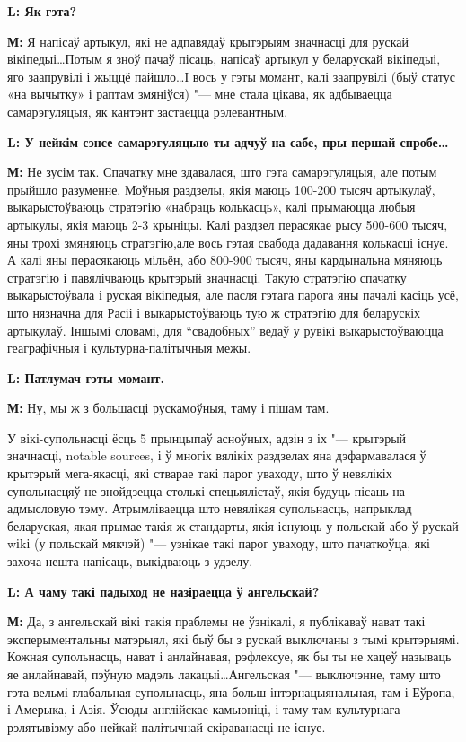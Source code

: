 \documentclass[10pt, a5paper]{article}
\begin{document}
{\noindent \bf L: Як гэта?}

{\noindent \bf М:} Я напісаў артыкул, які не адпавядаў крытэрыям значнасці для рускай вікіпедыі\ldots Потым я зноў пачаў пісаць, напісаў артыкул у беларускай вікіпедыі, яго заапрувілі і жыццё пайшло\ldots І вось у гэты момант, калі заапрувілі (быў статус «на вычытку» і раптам змяніўся) "--- мне стала цікава, як адбываецца самарэгуляцыя, як кантэнт застаецца рэлевантным.

{\noindent \bf L: У нейкім сэнсе самарэгуляцыю ты адчуў на сабе, пры першай спробе\ldots}

{\noindent \bf М:} Не зусім так. Спачатку мне здавалася, што гэта самарэгуляцыя, але потым прыйшло разуменне. Моўныя раздзелы, якія маюць 100-200 тысяч артыкулаў, выкарыстоўваюць стратэгію «набраць колькасць», калі прымаюцца любыя артыкулы, якія маюць 2-3 крыніцы. Калі раздзел перасякае рысу 500-600 тысяч, яны трохі змяняюць стратэгію,але вось гэтая свабода дадавання колькасці існуе. А калі яны перасякаюць мільён, або 800-900 тысяч, яны кардынальна мяняюць стратэгію і павялічваюць крытэрый значнасці. Такую стратэгію спачатку выкарыстоўвала і руская вікіпедыя, але пасля гэтага парога яны пачалі касіць усё, што нязначна для Расіі і выкарыстоўваюць тую ж стратэгію для беларускіх артыкулаў. Іншымі словамі, для “свадобных” ведаў у рувікі выкарыстоўваюцца геаграфічныя і культурна-палітычныя межы.


{\noindent \bf L: Патлумач гэты момант.}

{\noindent \bf М:} Ну, мы ж з большасці рускамоўныя, таму і пішам там.

У вікі-супольнасці ёсць 5 прынцыпаў асноўных, адзін з іх "--- крытэрый значнасці, notable sources, і ў многіх вялікіх раздзелах яна дэфармавалася ў крытэрый мега-якасці, які стварае такі парог уваходу, што ў невялікіх супольнасцяў не знойдзецца столькі спецыялістаў, якія будуць пісаць на адмысловую тэму. Атрымліваецца што невялікая супольнасць, напрыклад беларуская, якая прымае такія ж стандарты, якія існуюць у польскай або ў рускай wіkі (у польскай мякчэй) "--- узнікае такі парог уваходу, што пачаткоўца, які захоча нешта напісаць, выкідваюць з удзелу.


{\noindent \bf L: А чаму такі падыход не назіраецца ў ангельскай?}

{\noindent \bf М:} Да, з ангельскай вікі такія праблемы не ўзнікалі, я публікаваў нават такі эксперыментальны матэрыял, які быў бы з рускай выключаны з тымі крытэрыямі. Кожная супольнасць, нават і анлайнавая, рэфлексуе, як бы ты не хацеў называць яе анлайнавай, пэўную мадэль лакацыі\ldots Ангельская "--- выключэнне, таму што гэта вельмі глабальная супольнасць, яна больш інтэрнацыянальная, там і Еўропа, і Амерыка, і Азія. Ўсюды англійскае камьюніці, і таму там культурнага рэлятывізму або нейкай палітычнай скіраванасці не існуе.
 
\end{document}
